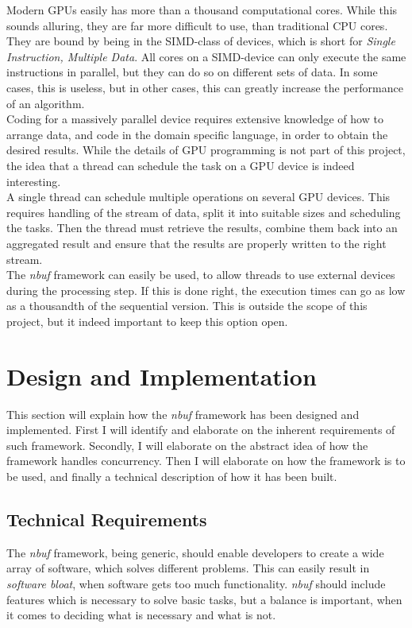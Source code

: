 \documentclass[a4paper]{article}
\newcommand{\nbuf}{\textit{nbuf} }
\begin{document}
Modern GPUs easily has more than a thousand computational cores. While this sounds alluring, they are far more difficult to use, than traditional CPU cores. They are bound by being in the SIMD-class of devices, which is short for \textit{Single Instruction, Multiple Data}. All cores on a SIMD-device can only execute the same instructions in parallel, but they can do so on different sets of data. In some cases, this is useless, but in other cases, this can greatly increase the performance of an algorithm.\\

Coding for a massively parallel device requires extensive knowledge of how to arrange data, and code in the domain specific language, in order to obtain the desired results. While the details of GPU programming is not part of this project, the idea that a thread can schedule the task on a GPU device is indeed interesting.\\

A single thread can schedule multiple operations on several GPU devices. This requires handling of the stream of data, split it into suitable sizes and scheduling the tasks. Then the thread must retrieve the results, combine them back into an aggregated result and ensure that the results are properly written to the right stream.\\

The \nbuf framework can easily be used, to allow threads to use external devices during the processing step. If this is done right, the execution times can go as low as a thousandth of the sequential version. This is outside the scope of this project, but it indeed important to keep this option open.





\newpage
\section{Design and Implementation}
This section will explain how the \nbuf framework has been designed and implemented. First I will identify and elaborate on the inherent requirements of such framework. Secondly, I will elaborate on the abstract idea of how the framework handles concurrency. Then I will elaborate on how the framework is to be used, and finally a technical description of how it has been built.


\subsection{Technical Requirements}
The \nbuf framework, being generic, should enable developers to create a wide array of software, which solves different problems. This can easily result in \textit{software bloat}, when software gets too much functionality. \nbuf should include features which is necessary to solve basic tasks, but a balance is important, when it comes to deciding what is necessary and what is not.
\end{document}

